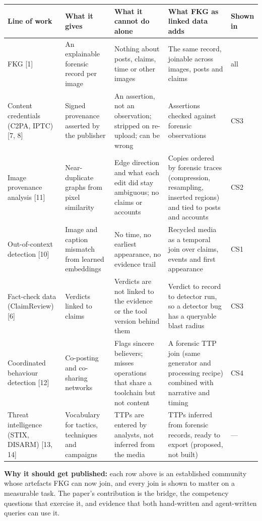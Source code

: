 \documentclass[11pt]{article}
\begin{document}
\begingroup\small
\begin{xltabular}{\linewidth}{@{}>{\raggedright\arraybackslash{}\hsize}X>{\raggedright\arraybackslash{}\hsize}X>{\raggedright\arraybackslash{}\hsize}X>{\raggedright\arraybackslash{}\hsize}Xl@{}}
\toprule
\textbf{Line of work} & \textbf{What it gives} & \textbf{What it cannot do alone} & \textbf{What FKG as linked data adds} & \textbf{Shown in} \\
\midrule
\endhead
FKG [1] & An explainable forensic record per image & Nothing about posts, claims, time or other images & The same record, joinable across images, posts and claims & all \\
Content credentials (C2PA, IPTC) [7, 8] & Signed provenance asserted by the publisher & An assertion, not an observation; stripped on re-upload; can be wrong & Assertions checked against forensic observations & CS3 \\
Image provenance analysis [11] & Near-duplicate graphs from pixel similarity & Edge direction and what each edit did stay ambiguous; no claims or accounts & Copies ordered by forensic traces (compression, resampling, inserted regions) and tied to posts and accounts & CS2 \\
Out-of-context detection [10] & Image and caption mismatch from learned embeddings & No time, no earliest appearance, no evidence trail & Recycled media as a temporal join over claims, events and first appearance & CS1 \\
Fact-check data (ClaimReview) [6] & Verdicts linked to claims & Verdicts are not linked to the evidence or the tool version behind them & Verdict to record to detector run, so a detector bug has a queryable blast radius & CS3 \\
Coordinated behaviour detection [12] & Co-posting and co-sharing networks & Flags sincere believers; misses operations that share a toolchain but not content & A forensic TTP join (same generator and processing recipe) combined with narrative and timing & CS4 \\
Threat intelligence (STIX, DISARM) [13, 14] & Vocabulary for tactics, techniques and campaigns & TTPs are entered by analysts, not inferred from the media & TTPs inferred from forensic records, ready to export (proposed, not built) & — \\
\bottomrule
\end{xltabular}
\endgroup

\textbf{Why it should get published:} each row above is an established community whose artefacts FKG can now join, and every join is shown to matter on a measurable task. The paper's contribution is the bridge, the competency questions that exercise it, and evidence that both hand-written and agent-written queries can use it.
\end{document}
